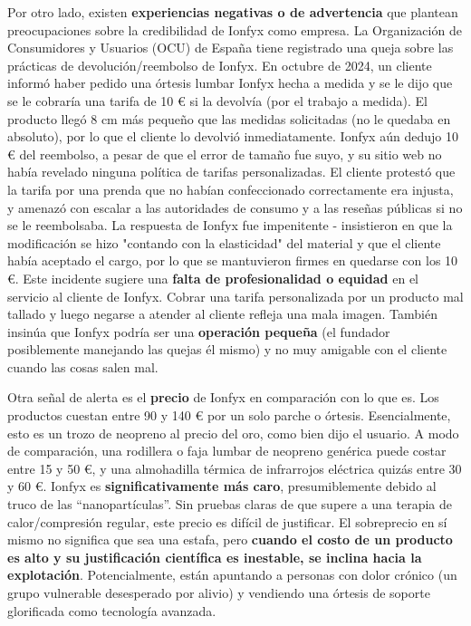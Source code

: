 \documentclass{article}
\begin{document}
Por otro lado, existen \textbf{experiencias negativas o de advertencia} que plantean preocupaciones sobre la credibilidad de Ionfyx como empresa. La Organización de Consumidores y Usuarios (OCU) de España tiene registrado una queja sobre las prácticas de devolución/reembolso de Ionfyx. En octubre de 2024, un cliente informó haber pedido una órtesis lumbar Ionfyx hecha a medida y se le dijo que se le cobraría una tarifa de 10 € si la devolvía (por el trabajo a medida). El producto llegó 8 cm más pequeño que las medidas solicitadas (no le quedaba en absoluto), por lo que el cliente lo devolvió inmediatamente. Ionfyx aún dedujo 10 € del reembolso, a pesar de que el error de tamaño fue suyo, y su sitio web no había revelado ninguna política de tarifas personalizadas. El cliente protestó que la tarifa por una prenda que no habían confeccionado correctamente era injusta, y amenazó con escalar a las autoridades de consumo y a las reseñas públicas si no se le reembolsaba. La respuesta de Ionfyx fue impenitente - insistieron en que la modificación se hizo "contando con la elasticidad" del material y que el cliente había aceptado el cargo, por lo que se mantuvieron firmes en quedarse con los 10 €. Este incidente sugiere una \textbf{falta de profesionalidad o equidad} en el servicio al cliente de Ionfyx. Cobrar una tarifa personalizada por un producto mal tallado y luego negarse a atender al cliente refleja una mala imagen. También insinúa que Ionfyx podría ser una \textbf{operación pequeña} (el fundador posiblemente manejando las quejas él mismo) y no muy amigable con el cliente cuando las cosas salen mal.

Otra señal de alerta es el \textbf{precio} de Ionfyx en comparación con lo que es. Los productos cuestan entre 90 y 140 € por un solo parche o órtesis. Esencialmente, esto es un trozo de neopreno al precio del oro, como bien dijo el usuario. A modo de comparación, una rodillera o faja lumbar de neopreno genérica puede costar entre 15 y 50 €, y una almohadilla térmica de infrarrojos eléctrica quizás entre 30 y 60 €. Ionfyx es \textbf{significativamente más caro}, presumiblemente debido al truco de las “nanopartículas”. Sin pruebas claras de que supere a una terapia de calor/compresión regular, este precio es difícil de justificar. El sobreprecio en sí mismo no significa que sea una estafa, pero \textbf{cuando el costo de un producto es alto y su justificación científica es inestable, se inclina hacia la explotación}. Potencialmente, están apuntando a personas con dolor crónico (un grupo vulnerable desesperado por alivio) y vendiendo una órtesis de soporte glorificada como tecnología avanzada.
\end{document}
